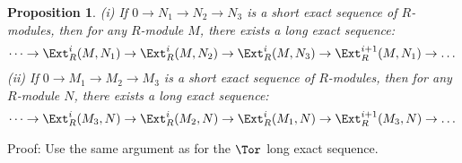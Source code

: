 \documentclass[10 pt]{article}
\newtheorem{prop}{Proposition}[section]
\newcommand\bprop{\begin{prop}}
\newcommand\eprop{\end{prop}}
\begin{document}
\bprop (i) If $0\rightarrow N_1\rightarrow N_2\rightarrow N_3$ is a short exact sequence of $R$-modules, then for any $R$-module $M$, there exists a long exact sequence: 
$$\dots\rightarrow \Ext^i_R(M,N_1)\rightarrow \Ext^i_R(M,N_2)\rightarrow \Ext^i_R(M,N_3)\rightarrow \Ext^{i+1}_R(M,N_1)\rightarrow\dots$$
(ii) If $0\rightarrow M_1\rightarrow M_2\rightarrow M_3$ is a short exact sequence of $R$-modules, then for any $R$-module $N$, there exists a long exact sequence:
$$\dots\rightarrow \Ext^i_R(M_3,N)\rightarrow \Ext^i_R(M_2,N)\rightarrow \Ext^i_R(M_1,N)\rightarrow \Ext^{i+1}_R(M_3,N)\rightarrow\dots$$
\eprop

Proof: Use the same argument as for the $\Tor$ long exact sequence.
\end{document}
